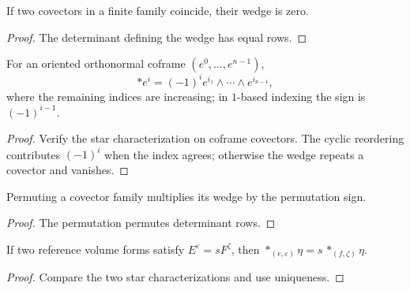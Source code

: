 \begin{lemma}
\label{lem:wedge-covectors-repeat-zero}





If two covectors in a finite family coincide, their wedge is zero.
\end{lemma}
\begin{proof}

\sketch The determinant defining the wedge has equal rows.
\end{proof}

\begin{proposition}
\label{prop:hodge-star-euclidean-single}





For an oriented orthonormal coframe $(e^0,\ldots,e^{n-1})$,
\[
{*} e^i=(-1)^i e^{i_1}\wedge\cdots\wedge e^{i_{n-1}},
\]
where the remaining indices are increasing; in $1$-based indexing the sign is $(-1)^{i-1}$.
\end{proposition}
\begin{proof}

\sketch Verify the star characterization on coframe covectors. The cyclic reordering contributes $(-1)^i$ when the index agrees; otherwise the wedge repeats a covector and vanishes.
\end{proof}

\begin{lemma}
\label{lem:wedge-covectors-sign}





Permuting a covector family multiplies its wedge by the permutation sign.
\end{lemma}
\begin{proof}

\sketch The permutation permutes determinant rows.
\end{proof}

\begin{lemma}
\label{lem:hodge-star-congr-smul}





If two reference volume forms satisfy $E^\varepsilon=sF^\zeta$, then $*_{(e,\varepsilon)}\eta=s\,*_{(f,\zeta)}\eta$.
\end{lemma}
\begin{proof}

\sketch Compare the two star characterizations and use uniqueness.
\end{proof}

